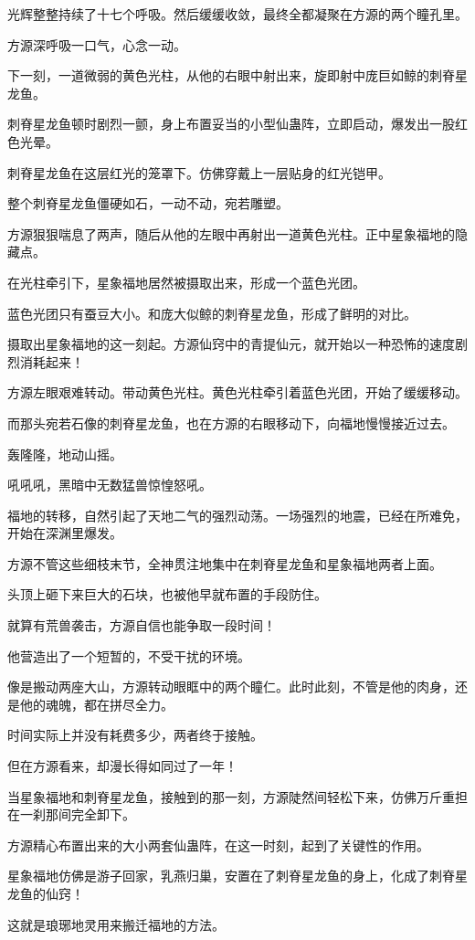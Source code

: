 \begin{this_body}
光辉整整持续了十七个呼吸。然后缓缓收敛，最终全都凝聚在方源的两个瞳孔里。

方源深呼吸一口气，心念一动。

下一刻，一道微弱的黄色光柱，从他的右眼中射出来，旋即射中庞巨如鲸的刺脊星龙鱼。

刺脊星龙鱼顿时剧烈一颤，身上布置妥当的小型仙蛊阵，立即启动，爆发出一股红色光晕。

刺脊星龙鱼在这层红光的笼罩下。仿佛穿戴上一层贴身的红光铠甲。

整个刺脊星龙鱼僵硬如石，一动不动，宛若雕塑。

方源狠狠喘息了两声，随后从他的左眼中再射出一道黄色光柱。正中星象福地的隐藏点。

在光柱牵引下，星象福地居然被摄取出来，形成一个蓝色光团。

蓝色光团只有蚕豆大小。和庞大似鲸的刺脊星龙鱼，形成了鲜明的对比。

摄取出星象福地的这一刻起。方源仙窍中的青提仙元，就开始以一种恐怖的速度剧烈消耗起来！

方源左眼艰难转动。带动黄色光柱。黄色光柱牵引着蓝色光团，开始了缓缓移动。

而那头宛若石像的刺脊星龙鱼，也在方源的右眼移动下，向福地慢慢接近过去。

轰隆隆，地动山摇。

吼吼吼，黑暗中无数猛兽惊惶怒吼。

福地的转移，自然引起了天地二气的强烈动荡。一场强烈的地震，已经在所难免，开始在深渊里爆发。

方源不管这些细枝末节，全神贯注地集中在刺脊星龙鱼和星象福地两者上面。

头顶上砸下来巨大的石块，也被他早就布置的手段防住。

就算有荒兽袭击，方源自信也能争取一段时间！

他营造出了一个短暂的，不受干扰的环境。

像是搬动两座大山，方源转动眼眶中的两个瞳仁。此时此刻，不管是他的肉身，还是他的魂魄，都在拼尽全力。

时间实际上并没有耗费多少，两者终于接触。

但在方源看来，却漫长得如同过了一年！

当星象福地和刺脊星龙鱼，接触到的那一刻，方源陡然间轻松下来，仿佛万斤重担在一刹那间完全卸下。

方源精心布置出来的大小两套仙蛊阵，在这一时刻，起到了关键性的作用。

星象福地仿佛是游子回家，乳燕归巢，安置在了刺脊星龙鱼的身上，化成了刺脊星龙鱼的仙窍！

这就是琅琊地灵用来搬迁福地的方法。


\end{this_body}
